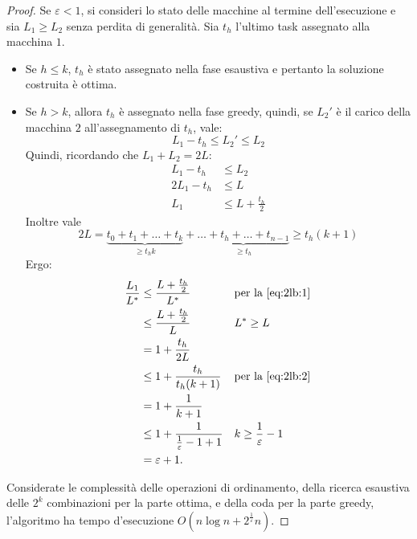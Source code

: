 \begin{proof}
	Se $\varepsilon<1$, si consideri lo stato delle macchine al termine dell'esecuzione e sia $L_1\geq L_2$ senza perdita di generalità.
	Sia $t_h$ l'ultimo task assegnato alla macchina $1$.
	\begin{itemize}
		\item Se $h\leq k$, $t_h$ è stato assegnato nella fase esaustiva e pertanto la soluzione costruita è ottima.
		\item Se $h>k$, allora $t_h$ è assegnato nella fase greedy, quindi, se $L_2'$ è il carico della macchina $2$ all'assegnamento di $t_h$, vale:
		      \begin{equation*}
			      L_1-t_h\leq L_2'\leq L_2
		      \end{equation*}
		      Quindi, ricordando che $L_1+L_2=2L$:
		      \begin{align}
			      L_1-t_h  & \leq L_2 \nonumber                    \\
			      2L_1-t_h & \leq L \nonumber                      \\
			      L_1      & \leq L+\frac{t_h}{2} \label{eq:2lb:1}
		      \end{align}
		      Inoltre vale
		      \begin{equation}\label{eq:2lb:2}
			      2L = \underbrace{t_0+t_1+\dots+t_k}_{\geq t_hk}+\underbrace{\dots+t_h+\dots+t_{n-1}}_{\geq t_h} \geq t_h(k+1)
		      \end{equation}
		      Ergo:
		      \begin{align*}
			      \frac{L_1}{L\star} & \leq \frac{L+\frac{t_h}{2}}{L\star}        &  & \text{per la \ref{eq:2lb:1}} \\
			                         & \leq \frac{L+\frac{t_h}{2}}{L}             &  & L\star\geq L                 \\
			                         & = 1+\frac{t_h}{2L}                                                           \\
			                         & \leq 1+\frac{t_h}{t_h(k+1)}                &  & \text{per la \ref{eq:2lb:2}} \\
			                         & = 1+\frac{1}{k+1}                                                            \\
			                         & \leq 1+\frac{1}{\frac{1}{\varepsilon}-1+1} &  & k\geq\frac{1}{\varepsilon}-1 \\
			                         & = \varepsilon+1 \text.
		      \end{align*}
	\end{itemize}
	Considerate le complessità delle operazioni di ordinamento, della ricerca esaustiva delle $2^k$ combinazioni per la parte ottima, e della coda per la parte greedy, l'algoritmo ha tempo d'esecuzione $O(n\log n+2^{\frac{1}{\varepsilon}}n)$.
\end{proof}



